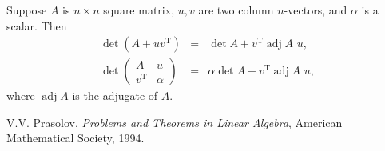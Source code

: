 \documentclass[12pt]{article}
\begin{document}
Suppose $A$ is $n\times n$ square matrix, $u,v$ are two column  $n$-vectors, and
$\alpha$ is a scalar. Then
\begin{eqnarray*}
\det (A + u v^{\operatorname{T}} ) &=& \det A + v^{\operatorname{T}} \operatorname{adj} A\,\, u, \\
\det \begin{pmatrix} A & u \\ v^{\operatorname{T}} & \alpha \end{pmatrix} &=& \alpha \det A - v^{\operatorname{T}} \operatorname{adj} A\,\, u,
\end{eqnarray*}
where $\operatorname{adj} A$ is the adjugate of $A$.

\begin{thebibliography}{9}
  V.V. Prasolov,
 \emph{Problems and Theorems in Linear Algebra},
 American Mathematical Society, 1994.
 \end{thebibliography}
\end{document}
